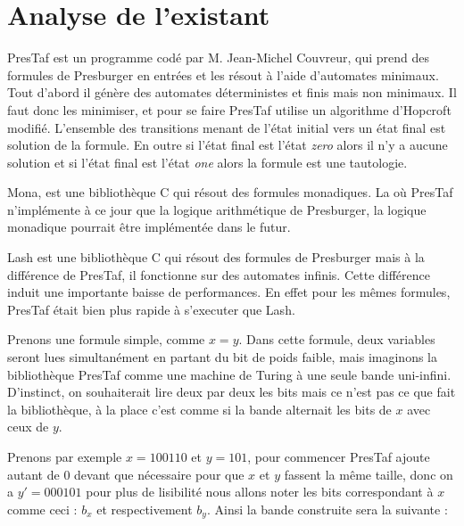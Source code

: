 \section{Analyse de l'existant}

PresTaf est un programme codé par M. Jean-Michel Couvreur, qui prend des formules de Presburger en entrées et les résout à l'aide d'automates minimaux. Tout d'abord il génère des automates déterministes et finis mais non minimaux. Il faut donc les minimiser, et pour se faire PresTaf utilise un algorithme d'Hopcroft modifié. L'ensemble des transitions menant de l'état initial vers un état final est solution de la formule. En outre si l'état final est l'état \emph{zero} alors il n'y a aucune solution et si l'état final est l'état \emph{one} alors la formule est une tautologie.\\\par

Mona, est une bibliothèque C qui résout des formules monadiques. La où PresTaf n'implémente à ce jour que la logique arithmétique de Presburger, la logique monadique pourrait être implémentée dans le futur.\\\par

Lash\cite{lash} est une bibliothèque C qui résout des formules de Presburger mais à la différence de PresTaf, il fonctionne sur des automates infinis. Cette différence induit une importante baisse de performances. En effet pour les mêmes formules, PresTaf était bien plus rapide à s'executer que Lash\cite{DBLP:conf/wia/Couvreur04}.\\\par

Prenons une formule simple, comme $x = y$. Dans cette formule, deux variables seront lues simultanément en partant du bit de poids faible, mais imaginons la bibliothèque PresTaf comme une machine de Turing à une seule bande uni-infini. D'instinct, on souhaiterait lire deux par deux les bits mais ce n'est pas ce que fait la bibliothèque, à la place c'est comme si la bande alternait les bits de $x$ avec ceux de $y$.\\\par
Prenons par exemple $x = 100110$ et $y = 101$, pour commencer PresTaf ajoute autant de 0 devant que nécessaire pour que $x$ et $y$ fassent la même taille, donc on a $y'=000101$ pour plus de lisibilité nous allons noter les bits correspondant à $x$ comme ceci : $b_x$ et respectivement $b_y$. Ainsi la bande construite sera la suivante :

